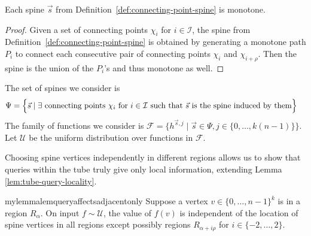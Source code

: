 \documentclass[11pt]{article}
\begin{document}
\begin{observation} \label{lem:spine_monotone}
Each spine $\vec{s}$ from Definition~\ref{def:connecting-point-spine} is monotone. 
\end{observation}
\begin{proof}
Given a set of connecting points $\chi_i$ for $i \in \mathcal{I}$, 
the spine from Definition~\ref{def:connecting-point-spine} is obtained  by generating a monotone path $P_i$ to connect each consecutive pair of connecting points $\chi_i$ and $\chi_{i+ \rho}$. Then the spine is the union of the $P_i$'s and thus monotone as well.
\end{proof}

\begin{definition}
The set of spines we consider is
\begin{align}
    \Psi &= \Bigl\{\vec{s} \mid \exists \mbox{ connecting points } \chi_i \mbox{ for } i \in \mathcal{I} \mbox{ such that } \vec{s} \mbox{ is the spine induced by them}\Bigr\}
\end{align}
The family of functions we consider is 
    $ \mathcal{F}  = \bigl\{ h^{\vec{s}, j} \mid \vec{s} \in \Psi, j \in \{0, \ldots, k(n-1)\}\bigr\}$. 
Let   $\mathcal{U}$ be the uniform distribution over functions in $\mathcal{F}$.
\end{definition}

Choosing spine vertices independently in different regions allows us to show that queries within the tube truly give only local information, extending Lemma \ref{lem:tube-query-locality}.


\begin{restatable}{mylemma}{lemqueryaffectsadjacentonly}
\label{lem:query-only-affects-adjacent-regions}
    Suppose a vertex $v \in \{0, \ldots, n-1\}^k$ is in a region $R_{\alpha}$. On input $f \sim \mathcal{U}$, the value of $f(v)$ is independent of the location of spine vertices in all regions except possibly regions %
    $R_{\alpha + i\rho}$ for  $i \in \{-2, \ldots, 2\}$.
\end{restatable}
\end{document}
